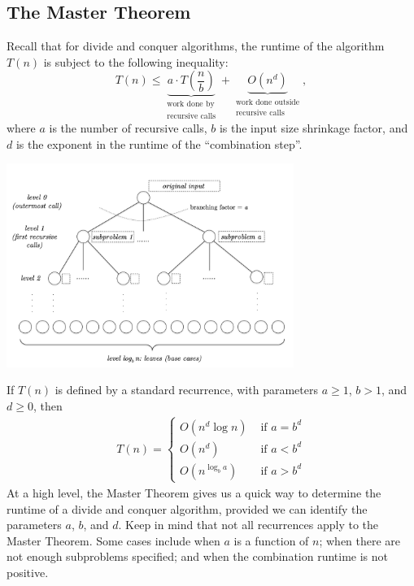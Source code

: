 \documentclass[11pt]{article}
\begin{document}
\subsection{The Master Theorem}
Recall that for divide and conquer algorithms, the runtime of the algorithm $T(n)$ is subject to the following inequality:
\begin{equation}
    T(n) \leq \underbrace{a \cdot T \left( \frac{n}{b} \right)}_{\substack{\text{work done by} \\ \text{recursive calls}}} + \underbrace{O(n^d)}_{\substack{\text{work done outside} \\ \text{recursive calls}}},
\end{equation}
where $a$ is the number of recursive calls, $b$ is the input size shrinkage factor, and $d$ is the exponent in the runtime of the ``combination step''.
\begin{center}
    \includegraphics[width=0.7\textwidth]{figures/recursion_tree.png}
\end{center}
If $T(n)$ is defined by a standard recurrence, with parameters $a \geq 1$, $b > 1$, and $d \geq 0$, then 
\begin{gather} \label{MasterThm}
    T(n) = \begin{cases}
        O(n^d \log n) & \text{ if } a = b^d \\
        O(n^d) & \text{ if } a < b^d \\
        O(n^{\log_b a}) & \text{ if } a > b^d
    \end{cases}
\end{gather}
At a high level, the Master Theorem gives us a quick way to determine the runtime of a divide and conquer algorithm, provided we can identify the parameters $a$, $b$, and $d$. Keep in mind that not all recurrences apply to the Master Theorem. Some cases include when $a$ is a function of $n$; when there are not enough subproblems specified; and when the combination runtime is not positive.
\end{document}

